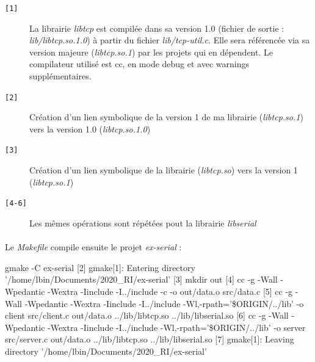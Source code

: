 \documentclass{article}
\begin{document}
    \begin{description}
        \item[\texttt{[1]} ] La librairie \emph{libtcp} est compilée dans sa version 1.0 (fichier de sortie : \emph{lib/libtcp.so.1.0}) à partir du fichier \emph{lib/tcp-util.c}. Elle sera référencée via sa version majeure (\emph{libtcp.so.1}) par les projets qui en dépendent. Le compilateur utilisé est cc, en mode debug et avec warnings supplémentaires.
        \item[\texttt{[2]} ] Création d'un lien symbolique de la version 1 de ma librairie (\emph{libtcp.so.1}) vers la version 1.0 (\emph{libtcp.so.1.0})
        \item[\texttt{[3]} ] Création d'un lien symbolique de la librairie (\emph{libtcp.so}) vers la version 1 (\emph{libtcp.so.1})
        \item[\texttt{[4-6]} ] Les mêmes opérations sont répétées pout la librairie \emph{libserial}
    \end{description}

    \paragraph{}
    Le \emph{Makefile} compile ensuite le projet \emph{ex-serial} :
    \begin{verbatimtab}
[1]         gmake -C ex-serial
[2]         gmake[1]: Entering directory '/home/lbin/Documents/2020_RI/ex-serial'
[3]         mkdir out
[4]         cc -g  -Wall -Wpedantic -Wextra -Iinclude -I../include
                -c -o out/data.o src/data.c
[5]         cc -g  -Wall -Wpedantic -Wextra -Iinclude -I../include
                -Wl,-rpath='\$ORIGIN/../lib' -o client src/client.c
                out/data.o ../lib/libtcp.so ../lib/libserial.so
[6]         cc -g  -Wall -Wpedantic -Wextra -Iinclude -I../include
                -Wl,-rpath='\$ORIGIN/../lib' -o server src/server.c
                out/data.o ../lib/libtcp.so ../lib/libserial.so
[7]         gmake[1]: Leaving directory '/home/lbin/Documents/2020_RI/ex-serial'
    \end{verbatimtab}
\end{document}
